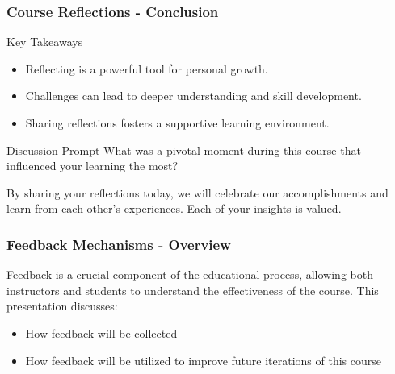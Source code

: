 \documentclass[aspectratio=169]{beamer}
\begin{document}
\begin{frame}[fragile]
    \frametitle{Course Reflections - Conclusion}
    \begin{block}{Key Takeaways}
        \begin{itemize}
            \item Reflecting is a powerful tool for personal growth.
            \item Challenges can lead to deeper understanding and skill development.
            \item Sharing reflections fosters a supportive learning environment.
        \end{itemize}
    \end{block}
    
    \begin{block}{Discussion Prompt}
        What was a pivotal moment during this course that influenced your learning the most?
    \end{block}
    
    By sharing your reflections today, we will celebrate our accomplishments and learn from each other's experiences. Each of your insights is valued.
\end{frame}

\begin{frame}[fragile]
    \frametitle{Feedback Mechanisms - Overview}
    Feedback is a crucial component of the educational process, allowing both instructors and students to understand the effectiveness of the course. 
    This presentation discusses:
    \begin{itemize}
        \item How feedback will be collected
        \item How feedback will be utilized to improve future iterations of this course
    \end{itemize}
\end{frame}
\end{document}
